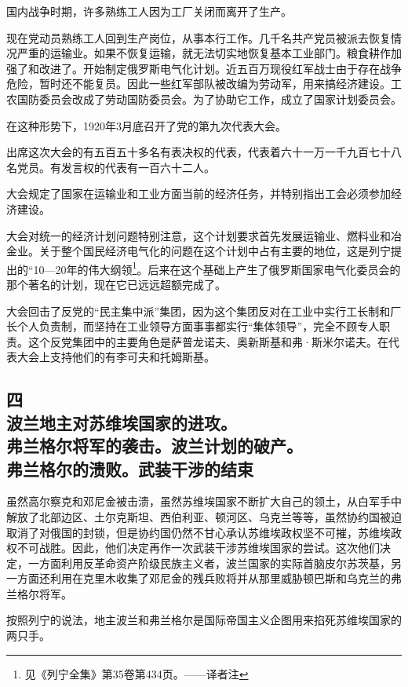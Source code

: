 国内战争时期，许多熟练工人因为工厂关闭而离开了生产。

现在党动员熟练工人回到生产岗位，从事本行工作。几千名共产党员被派去恢复情况严重的运输业。如果不恢复运输，就无法切实地恢复基本工业部门。粮食耕作加强了和改进了。开始制定俄罗斯电气化计划。近五百万现役红军战士由于存在战争危险，暂时还不能复员。因此一些红军部队被改编为劳动军，用来搞经济建设。工农国防委员会改成了劳动国防委员会。为了协助它工作，成立了国家计划委员会。

在这种形势下，1920年3月底召开了党的第九次代表大会。

出席这次大会的有五百五十多名有表决权的代表，代表着六十一万一千九百七十八名党员。有发言权的代表有一百六十二人。

大会规定了国家在运输业和工业方面当前的经济任务，并特别指出工会必须参加经济建设。

大会对统一的经济计划问题特别注意，这个计划要求首先发展运输业、燃料业和冶金业。关于整个国民经济电气化的问题在这个计划中占有主要的地位，这是列宁提出的“10—20年的伟大纲领\footnote{见《列宁全集》第35卷第434页。——译者注}。后来在这个基础上产生了俄罗斯国家电气化委员会的那个著名的计划，现在它已远远超额完成了。

大会回击了反党的“民主集中派”集团，因为这个集团反对在工业中实行工长制和厂长个人负责制，而坚持在工业领导方面事事都实行“集体领导”，完全不顾专人职责。这个反党集团中的主要角色是萨普龙诺夫、奥新斯基和弗·斯米尔诺夫。在代表大会上支持他们的有李可夫和托姆斯基。


\subsection[四\q 波兰地主对苏维埃国家的进攻。弗兰格尔将军的袭击。波兰计划的破产。弗兰格尔的溃败。武装干涉的结束]{四\\波兰地主对苏维埃国家的进攻。\\弗兰格尔将军的袭击。波兰计划的破产。\\弗兰格尔的溃败。武装干涉的结束}

虽然高尔察克和邓尼金被击溃，虽然苏维埃国家不断扩大自己的领土，从白军手中解放了北部边区、土尔克斯坦、西伯利亚、顿河区、乌克兰等等，虽然协约国被迫取消了对俄国的封锁，但是协约国仍然不甘心承认苏维埃政权坚不可摧，苏维埃政权不可战胜。因此，他们决定再作一次武装干涉苏维埃国家的尝试。这次他们决定，一方面利用反革命资产阶级民族主义者，波兰国家的实际首脑皮尔苏茨基，另一方面还利用在克里木收集了邓尼金的残兵败将并从那里威胁顿巴斯和乌克兰的弗兰格尔将军。

按照列宁的说法，地主波兰和弗兰格尔是国际帝国主义企图用来掐死苏维埃国家的两只手。

